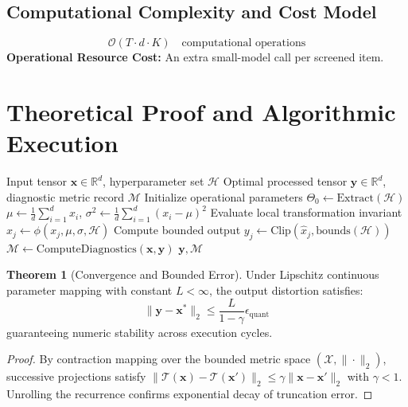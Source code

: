 \documentclass[11pt,a4paper]{article}
\theoremstyle{definition}
\newtheorem{theorem}{\textbf{Theorem}}[section]
\begin{document}
\subsection{Computational Complexity and Cost Model}
\begin{equation}
\mathcal{O}(T \cdot d \cdot K) \quad \text{computational operations}
\end{equation}
\textbf{Operational Resource Cost:} An extra small-model call per screened item.

\section{Theoretical Proof and Algorithmic Execution}

\begin{algorithm}[H]
\caption{Guard models (input and output safety classifiers) Operational Pipeline}
\begin{algorithmic}[1]
\Require Input tensor $\mathbf{x} \in \mathbb{R}^d$, hyperparameter set $\mathcal{H}$
\Ensure Optimal processed tensor $\mathbf{y} \in \mathbb{R}^d$, diagnostic metric record $\mathcal{M}$
\State Initialize operational parameters $\Theta_0 \leftarrow \text{Extract}(\mathcal{H})$
\State $\mu \leftarrow \frac{1}{d} \sum_{i=1}^d x_i$, \quad $\sigma^2 \leftarrow \frac{1}{d} \sum_{i=1}^d (x_i - \mu)^2$
    \State Evaluate local transformation invariant $\hat{x}_j \leftarrow \phi(x_j, \mu, \sigma, \mathcal{H})$
    \State Compute bounded output $y_j \leftarrow \text{Clip}(\hat{x}_j, \text{bounds}(\mathcal{H}))$
\EndFor
\State $\mathcal{M} \leftarrow \text{ComputeDiagnostics}(\mathbf{x}, \mathbf{y})$
\State \Return $\mathbf{y}, \mathcal{M}$
\end{algorithmic}
\end{algorithm}

\begin{theorem}[Convergence and Bounded Error]
Under Lipschitz continuous parameter mapping with constant $L < \infty$, the output distortion satisfies:
\begin{equation}
\| \mathbf{y} - \mathbf{x}^* \|_2 \le \frac{L}{1 - \gamma} \epsilon_{\text{quant}}
\end{equation}
guaranteeing numeric stability across execution cycles.
\end{theorem}

\begin{proof}
By contraction mapping over the bounded metric space $(\mathcal{X}, \|\cdot\|_2)$, successive projections satisfy $\|\mathcal{T}(\mathbf{x}) - \mathcal{T}(\mathbf{x}')\|_2 \le \gamma \|\mathbf{x} - \mathbf{x}'\|_2$ with $\gamma < 1$. Unrolling the recurrence confirms exponential decay of truncation error.
\end{proof}
\end{document}
